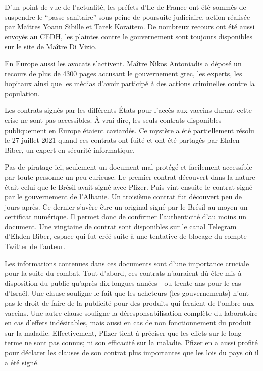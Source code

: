 \documentclass[a4paper]{article}
\begin{document}
\begin{multicols}{3}
D'un point de vue de l'actualité, les préfets d'Ile-de-France ont été
sommés de suspendre le ``passe sanitaire'' sous peine de poursuite
judiciaire, action réalisée par Maîtres Yoann Sibille et Tarek
Koraitem\cite{LeParisien:SuspensionPassSanitaire}. De nombreux recours
ont été aussi envoyés au CEDH\cite{NoPass:CEDH}, les plaintes contre le
gouvernement sont toujours disponibles sur le site de Maître Di
Vizio\cite{DiVizio:PlaintesVeranCastex}.

En Europe aussi les avocats s'activent. Maître Nikos Antoniadis a
déposé un recours de plus de 4300 pages\cite{NikosAntoniadis:Recours}
accusant le gouvernement grec, les experts, les hopitaux ainsi que
les médias d'avoir participé à des actions criminelles contre la
population.

\closearticle


Les contrats signés par les différents États pour l'accès aux vaccins
durant cette crise ne sont pas accessibles. À vrai dire, les seuls
contrats disponibles publiquement en Europe étaient caviardés. Ce
mystère a été partiellement résolu le 27 juillet 2021 quand ces
contrats ont fuité et ont été partagés\cite{EhdenBiber:Pfizerleak}
par Ehden Biber, un expert en sécurité informatique.

Pas de piratage ici, seulement un document mal protégé et facilement
accessible par toute personne un peu curieuse. Le premier contrat
découvert dans la nature était celui que le Brésil avait signé avec
Pfizer. Puis vint ensuite le contrat signé par le gouvernement de
l'Albanie. Un troisième contrat fut découvert peu de jours après. Ce
dernier s'avère être un original signé par le Brésil au moyen un
certificat numérique. Il permet donc de confirmer l'authenticité d'au
moins un document. Une vingtaine de contrat sont disponibles sur le
canal Telegram\cite{EhdenBiber:Files} d'Ehden Biber, espace qui fut
créé suite à une tentative de blocage du compte Twitter de l'auteur.

Les informations contenues dans ces documents sont d'une importance
cruciale pour la suite du combat. Tout d'abord, ces contrats
n'auraient dû être mis à disposition du public qu'après dix longues
années - ou trente ans pour le cas d'Israël. Une clause souligne le
fait que les acheteurs (les gouvernements) n'ont pas le droit de faire
de la publicité pour des produits qui feraient de l'ombre aux
vaccins. Une autre clause souligne la déresponsabilisation complète du
laboratoire en cas d'effets indésirables, mais aussi en cas de non
fonctionnement du produit sur la maladie. Effectivement, Pfizer tient
à préciser que les effets sur le long terme ne sont pas connus; ni son
efficacité sur la maladie. Pfizer en a aussi profité pour déclarer les
clauses de son contrat plus importantes que les lois du pays où il a
été signé.


\end{multicols}
\end{document}
